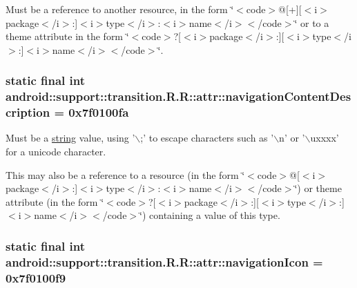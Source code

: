 Must be a reference to another resource, in the form \char`\"{}$<$code$>$@\mbox{[}+\mbox{]}\mbox{[}$<$i$>$package$<$/i$>$:\mbox{]}$<$i$>$type$<$/i$>$:$<$i$>$name$<$/i$>$$<$/code$>$\char`\"{} or to a theme attribute in the form \char`\"{}$<$code$>$?\mbox{[}$<$i$>$package$<$/i$>$:\mbox{]}\mbox{[}$<$i$>$type$<$/i$>$:\mbox{]}$<$i$>$name$<$/i$>$$<$/code$>$\char`\"{}. \hypertarget{classandroid_1_1support_1_1transition_1_1_r_1_1attr_7e03141fdeb55d645d763b8aaa789713}{
\subsubsection[{navigationContentDescription}]{\setlength{\rightskip}{0pt plus 5cm}static final int android::support::transition.R.R::attr::navigationContentDescription = 0x7f0100fa}}
\label{classandroid_1_1support_1_1transition_1_1_r_1_1attr_7e03141fdeb55d645d763b8aaa789713}


Must be a \hyperlink{classandroid_1_1support_1_1transition_1_1_r_1_1string}{string} value, using '$\backslash$;' to escape characters such as '$\backslash$n' or '$\backslash$uxxxx' for a unicode character. 

This may also be a reference to a resource (in the form \char`\"{}$<$code$>$@\mbox{[}$<$i$>$package$<$/i$>$:\mbox{]}$<$i$>$type$<$/i$>$:$<$i$>$name$<$/i$>$$<$/code$>$\char`\"{}) or theme attribute (in the form \char`\"{}$<$code$>$?\mbox{[}$<$i$>$package$<$/i$>$:\mbox{]}\mbox{[}$<$i$>$type$<$/i$>$:\mbox{]}$<$i$>$name$<$/i$>$$<$/code$>$\char`\"{}) containing a value of this type. \hypertarget{classandroid_1_1support_1_1transition_1_1_r_1_1attr_98c3b7ead933bee3bd350c64a99f48e6}{
\subsubsection[{navigationIcon}]{\setlength{\rightskip}{0pt plus 5cm}static final int android::support::transition.R.R::attr::navigationIcon = 0x7f0100f9}}
\label{classandroid_1_1support_1_1transition_1_1_r_1_1attr_98c3b7ead933bee3bd350c64a99f48e6}


